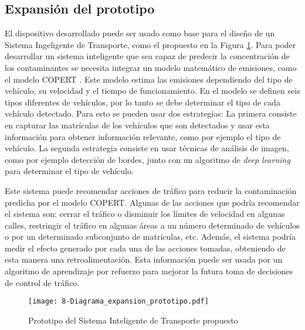 \subsection{Expansión del prototipo}
El dispositivo desarrollado puede ser usado como base para el diseño de un Sistema Ingeligente de Transporte, como el propuesto en la Figura \ref{fig:8-Diagrama_expansión_prototipo}. Para poder desarrollar un sistema inteligente que sea capaz de predecir la concentración de los contaminantes se necesita integrar un modelo matemático de emisiones, como el modelo COPERT \cite{NS16}. Este modelo estima las emisiones dependiendo del tipo de vehículo, su velocidad y el tiempo de funcionamiento. En el modelo se definen seis tipos diferentes de vehículos, por lo tanto se debe determinar el tipo de cada vehículo detectado. Para esto se pueden usar dos estrategias: La primera consiste en capturar las matrículas de los vehículos que son detectados y usar esta información para obtener información relevante, como por ejemplo el tipo de vehículo. La segunda estrategia consiste en usar técnicas de análisis de imagen, como por ejemplo detección de bordes, junto con un algoritmo de \textit{deep learning} para determinar el tipo de vehículo.

Este sistema puede recomendar acciones de tráfico para reducir la contaminación predicha por el modelo COPERT. Algunas de las acciones que podría  recomendar el sistema son: cerrar el tráfico o disminuir los límites de velocidad en algunas calles, restringir el tráfico en algunas áreas a un número determinado de vehículos o por un determinado subconjunto de matrículas, etc. Además, el sistema podría medir el efecto generado por cada una de las acciones tomadas, obteniendo de esta manera una retroalimentación. Esta información puede ser usada por un algoritmo de aprendizaje por refuerzo para mejorar la futura toma de decisiones de control de tráfico.

\begin{figure}[!h]
	\begin{center}
		\texttt{[image: 8-Diagrama\_expansion\_prototipo.pdf]}
		\caption{Prototipo del Sistema Inteligente de Transporte propuesto}
		\label{fig:8-Diagrama_expansión_prototipo}
	\end{center}
\end{figure}


